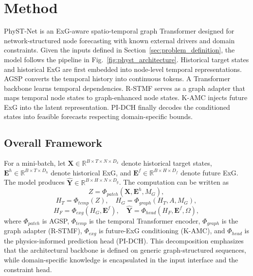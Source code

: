 \section{Method}
\label{sec:methodology}
PhyST-Net is an ExG-aware spatio-temporal graph Transformer designed for network-structured node forecasting with known external drivers and domain constraints. Given the inputs defined in Section~\ref{sec:problem_definition}, the model follows the pipeline in Fig.~\ref{fig:physt_architecture}. Historical target states and historical ExG are first embedded into node-level temporal representations. AGSP converts the temporal history into continuous tokens. A Transformer backbone learns temporal dependencies. R-STMF serves as a graph adapter that maps temporal node states to graph-enhanced node states. K-AMC injects future ExG into the latent representation. PI-DCH finally decodes the conditioned states into feasible forecasts respecting domain-specific bounds.



\subsection{Overall Framework}
\label{sec:overall_framework}
For a mini-batch, let $\mathbf{X}\in\mathbb{R}^{B\times T\times N\times D_x}$ denote historical target states, $\mathbf{E}^h\in\mathbb{R}^{B\times T\times D_h}$ denote historical ExG, and $\mathbf{E}^f\in\mathbb{R}^{B\times H\times D_f}$ denote future ExG. The model produces $\hat{\mathbf{Y}}\in\mathbb{R}^{B\times H\times N\times D_y}$. The computation can be written as
\begin{equation}
Z = \Phi_{patch}(\mathbf{X},\mathbf{E}^{h},M_G),
\label{eq:overall_patch}
\end{equation}
\begin{equation}
H_T = \Phi_{temp}(Z),\quad H_G = \Phi_{graph}(H_T,A,M_G),
\label{eq:overall_temp_graph}
\end{equation}
\begin{equation}
H_F = \Phi_{exg}(H_G,\mathbf{E}^{f}),\quad \hat{\mathbf{Y}} = \Phi_{head}(H_F,\mathbf{E}^{f},\Omega),
\label{eq:overall_exg_head}
\end{equation}
where $\Phi_{patch}$ is AGSP, $\Phi_{temp}$ is the temporal Transformer encoder, $\Phi_{graph}$ is the graph adapter (R-STMF), $\Phi_{exg}$ is future-ExG conditioning (K-AMC), and $\Phi_{head}$ is the physics-informed prediction head (PI-DCH). This decomposition emphasizes that the architectural backbone is defined on generic graph-structured sequences, while domain-specific knowledge is encapsulated in the input interface and the constraint head.

